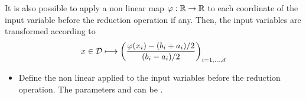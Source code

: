 It is also possible to apply a non linear map $\varphi:{\mathbb R} \to {\mathbb R}$ to each coordinate of the input variable before the reduction operation if any. Then, the input variables are transformed according to
\begin{equation}
  \label{basis_non_linear_reduced}
  x \in {\mathcal D} \longmapsto \left(\frac{\varphi(x_i) - (b_i+a_i)/2}{(b_i - a_i)/2}
  \right)_{i=1,\dots,d}
\end{equation}


\begin{itemize}
\item {}
\sshortdescribe Define the non linear applied to the input variables before the reduction operation. The parameters  and  can be .
\end{itemize}

